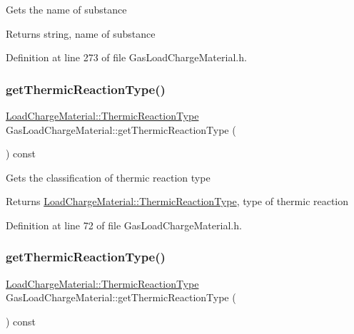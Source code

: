 Gets the name of substance

\begin{DoxyReturn}{Returns}
string, name of substance 
\end{DoxyReturn}


Definition at line 273 of file Gas\+Load\+Charge\+Material.\+h.

\mbox{\label{class_gas_load_charge_material_ac801f30ccf58ce98fdb6b8cdb0a9767f}} 
\subsubsection{\texorpdfstring{get\+Thermic\+Reaction\+Type()}{getThermicReactionType()}\hspace{0.1cm}{\footnotesize\ttfamily [1/3]}}
{\footnotesize\ttfamily \hyperlink{class_load_charge_material_a51d4263e865a5d86236622dd3fe23fd1}{Load\+Charge\+Material\+::\+Thermic\+Reaction\+Type} Gas\+Load\+Charge\+Material\+::get\+Thermic\+Reaction\+Type (\begin{DoxyParamCaption}{ }\end{DoxyParamCaption}) const\hspace{0.3cm}{\ttfamily [inline]}}

Gets the classification of thermic reaction type

\begin{DoxyReturn}{Returns}
\hyperlink{class_load_charge_material_a51d4263e865a5d86236622dd3fe23fd1}{Load\+Charge\+Material\+::\+Thermic\+Reaction\+Type}, type of thermic reaction 
\end{DoxyReturn}


Definition at line 72 of file Gas\+Load\+Charge\+Material.\+h.

\mbox{\label{class_gas_load_charge_material_ac801f30ccf58ce98fdb6b8cdb0a9767f}} 
\subsubsection{\texorpdfstring{get\+Thermic\+Reaction\+Type()}{getThermicReactionType()}\hspace{0.1cm}{\footnotesize\ttfamily [2/3]}}
{\footnotesize\ttfamily \hyperlink{class_load_charge_material_a51d4263e865a5d86236622dd3fe23fd1}{Load\+Charge\+Material\+::\+Thermic\+Reaction\+Type} Gas\+Load\+Charge\+Material\+::get\+Thermic\+Reaction\+Type (\begin{DoxyParamCaption}{ }\end{DoxyParamCaption}) const\hspace{0.3cm}{\ttfamily [inline]}}

